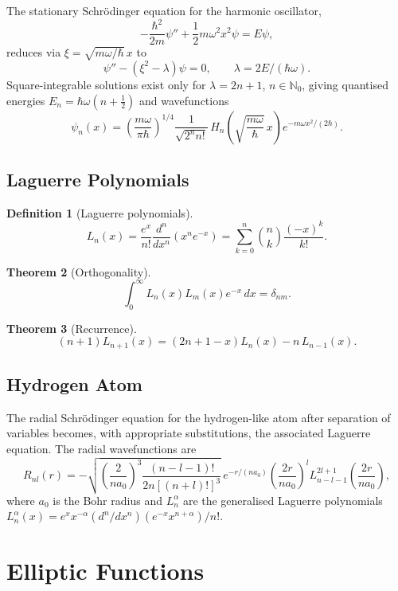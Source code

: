 \documentclass[12pt,a4paper]{amsart}
\newtheorem{theorem}{Theorem}[section]
\theoremstyle{definition}
\newtheorem{definition}[theorem]{Definition}
\begin{document}
The stationary Schr\"odinger equation for the harmonic oscillator,
\[
  -\frac{\hbar^2}{2m}\psi'' + \frac{1}{2}m\omega^2 x^2\psi = E\psi,
\]
reduces via \(\xi = \sqrt{m\omega/\hbar}\,x\) to
\[
  \psi'' - (\xi^2 - \lambda)\psi = 0, \qquad \lambda = 2E/(\hbar\omega).
\]
Square-integrable solutions exist only for \(\lambda = 2n+1\), \(n \in \mathbb{N}_0\),
giving quantised energies \(E_n = \hbar\omega(n+\tfrac{1}{2})\) and wavefunctions
\[
  \psi_n(x) = \left(\frac{m\omega}{\pi\hbar}\right)^{1/4}
  \frac{1}{\sqrt{2^n n!}}\,H_n\!\left(\sqrt{\frac{m\omega}{\hbar}}\,x\right)
  e^{-m\omega x^2/(2\hbar)}.
\]

\subsection{Laguerre Polynomials}

\begin{definition}[Laguerre polynomials]
\[
  L_n(x) = \frac{e^x}{n!}\frac{d^n}{dx^n}(x^n e^{-x}) = \sum_{k=0}^n \binom{n}{k}
  \frac{(-x)^k}{k!}.
\]
\end{definition}

\begin{theorem}[Orthogonality]
\[
  \int_0^\infty L_n(x)L_m(x)e^{-x}\,dx = \delta_{nm}.
\]
\end{theorem}

\begin{theorem}[Recurrence]
\[
  (n+1)L_{n+1}(x) = (2n+1-x)L_n(x) - n\,L_{n-1}(x).
\]
\end{theorem}

\subsection{Hydrogen Atom}

The radial Schr\"odinger equation for the hydrogen-like atom after separation of variables
becomes, with appropriate substitutions, the associated Laguerre equation.  The radial
wavefunctions are
\[
  R_{nl}(r) = -\sqrt{\left(\frac{2}{na_0}\right)^3\frac{(n-l-1)!}{2n[(n+l)!]^3}}\,
  e^{-r/(na_0)}\!\left(\frac{2r}{na_0}\right)^l L_{n-l-1}^{2l+1}\!\!\left(\frac{2r}{na_0}\right),
\]
where \(a_0\) is the Bohr radius and \(L_n^\alpha\) are the generalised Laguerre polynomials
\(L_n^\alpha(x) = e^x x^{-\alpha}(d^n/dx^n)(e^{-x}x^{n+\alpha})/n!\).

\section{Elliptic Functions}
\label{sec:elliptic}
\end{document}
